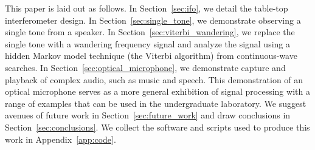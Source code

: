 \documentclass[paper-main.tex]{subfiles}
\begin{document}
This paper is laid out as follows. 
In Section~\ref{sec:ifo}, we detail the table-top interferometer design. 
In Section~\ref{sec:single_tone}, we demonstrate observing a single tone from a speaker. 
In Section~\ref{sec:viterbi_wandering}, we replace the single tone with a wandering frequency signal and analyze the signal using a hidden Markov model technique (the Viterbi algorithm) from continuous-wave searches. 
In Section~\ref{sec:optical_microphone}, we demonstrate capture and playback of complex audio, such as music and speech.
This demonstration of an optical microphone serves as a more general exhibition of signal processing with a range of examples that can be used in the undergraduate laboratory. 
We suggest avenues of future work in Section~\ref{sec:future_work} and draw conclusions in Section~\ref{sec:conclusions}. 
We collect the software and scripts used to produce this work in Appendix~\ref{app:code}.
\end{document}
